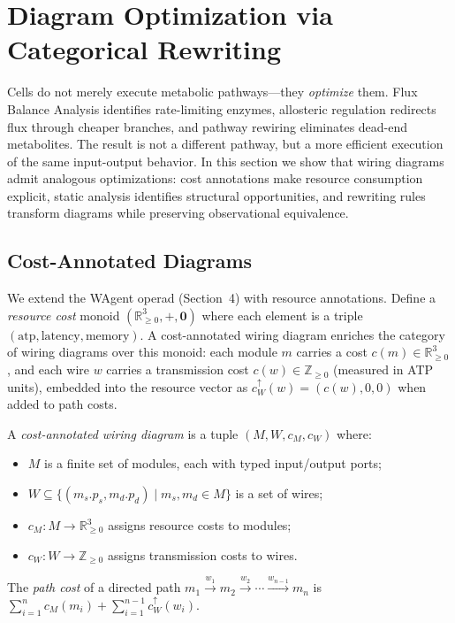 \section{Diagram Optimization via Categorical Rewriting}

Cells do not merely execute metabolic pathways---they \emph{optimize} them.
Flux Balance Analysis identifies rate-limiting enzymes, allosteric regulation
redirects flux through cheaper branches, and pathway rewiring eliminates
dead-end metabolites. The result is not a different pathway, but a more
efficient execution of the same input-output behavior. In this section we
show that wiring diagrams admit analogous optimizations: cost annotations
make resource consumption explicit, static analysis identifies structural
opportunities, and rewriting rules transform diagrams while preserving
observational equivalence.

\subsection{Cost-Annotated Diagrams}

We extend the WAgent operad (Section~4) with resource annotations.
Define a \emph{resource cost} monoid $(\mathbb{R}_{\geq 0}^3, +, \mathbf{0})$
where each element is a triple $(\text{atp}, \text{latency}, \text{memory})$.
A cost-annotated wiring diagram enriches the category of wiring diagrams
over this monoid: each module $m$ carries a cost $c(m) \in \mathbb{R}_{\geq 0}^3$,
and each wire $w$ carries a transmission cost $c(w) \in \mathbb{Z}_{\geq 0}$
(measured in ATP units), embedded into the resource vector as
$c_W^\uparrow(w) = (c(w), 0, 0)$ when added to path costs.

\begin{definition}\label{def:cost-annotated-diagram}
A \emph{cost-annotated wiring diagram} is a tuple $(M, W, c_M, c_W)$ where:
\begin{itemize}[leftmargin=*]
\item $M$ is a finite set of modules, each with typed input/output ports;
\item $W \subseteq \{(m_s.p_s, m_d.p_d) \mid m_s, m_d \in M\}$ is a set of wires;
\item $c_M : M \to \mathbb{R}_{\geq 0}^3$ assigns resource costs to modules;
\item $c_W : W \to \mathbb{Z}_{\geq 0}$ assigns transmission costs to wires.
\end{itemize}
The \emph{path cost} of a directed path $m_1 \xrightarrow{w_1} m_2 \xrightarrow{w_2} \cdots \xrightarrow{w_{n-1}} m_n$
is $\sum_{i=1}^{n} c_M(m_i) + \sum_{i=1}^{n-1} c_W^\uparrow(w_i)$.
\end{definition}

